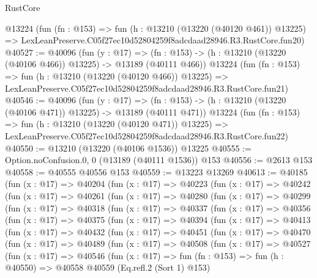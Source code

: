 \begin{lexlean}{RustCore}
\begin{coremodule}
    @13224
    (fun (fn : @153) =>
    fun (h : @13210 (@13220 (@40120 @461)) @13225) =>
    LexLeanPreserve.C05f27ec10d52804259f8adcdaad28946.R3.RustCore.fun20)
@40527 := @40096
    (fun (y : @17) =>
    (fn : @153) -> (h : @13210 (@13220 (@40106 @466)) @13225) -> @13189 (@40111 @466))
    @13224
    (fun (fn : @153) =>
    fun (h : @13210 (@13220 (@40120 @466)) @13225) =>
    LexLeanPreserve.C05f27ec10d52804259f8adcdaad28946.R3.RustCore.fun21)
@40546 := @40096
    (fun (y : @17) =>
    (fn : @153) -> (h : @13210 (@13220 (@40106 @471)) @13225) -> @13189 (@40111 @471))
    @13224
    (fun (fn : @153) =>
    fun (h : @13210 (@13220 (@40120 @471)) @13225) =>
    LexLeanPreserve.C05f27ec10d52804259f8adcdaad28946.R3.RustCore.fun22)
@40550 := @13210 (@13220 (@40106 @1536)) @13225
@40555 := Option.noConfusion.{0, 0} (@13189 (@40111 @1536)) @153
@40556 := @2613 @153
@40558 := @40555 @40556 @153
@40559 := @13223 @13269
@40613 := @40185
    (fun (x : @17) =>
    @40204
      (fun (x : @17) =>
      @40223
        (fun (x : @17) =>
        @40242
          (fun (x : @17) =>
          @40261
            (fun (x : @17) =>
            @40280
              (fun (x : @17) =>
              @40299
                (fun (x : @17) =>
                @40318
                  (fun (x : @17) =>
                  @40337
                    (fun (x : @17) =>
                    @40356
                      (fun (x : @17) =>
                      @40375
                        (fun (x : @17) =>
                        @40394
                          (fun (x : @17) =>
                          @40413
                            (fun (x : @17) =>
                            @40432
                              (fun (x : @17) =>
                              @40451
                                (fun (x : @17) =>
                                @40470
                                  (fun (x : @17) =>
                                  @40489
                                    (fun (x : @17) =>
                                    @40508
                                      (fun (x : @17) =>
                                      @40527
                                        (fun (x : @17) =>
                                        @40546
                                          (fun (x : @17) =>
                                          fun (fn : @153) =>
                                          fun (h : @40550) =>
                                          @40558
                                            @40559
                                            (Eq.refl.{2} (Sort 1) @153)

\end{coremodule}
\end{lexlean}
